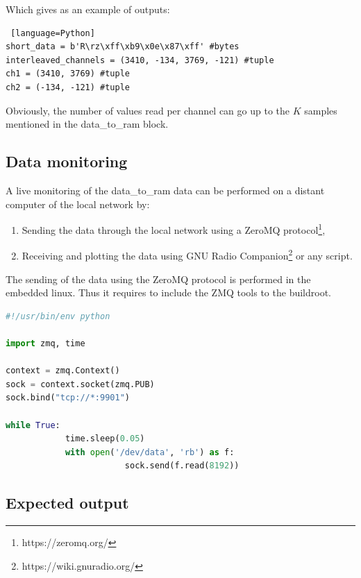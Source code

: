 \documentclass[12pt,oneside]{article}
\begin{document}
Which gives as an example of outputs:


\begin{lstlisting} [language=Python]
short_data = b'R\rz\xff\xb9\x0e\x87\xff' #bytes
interleaved_channels = (3410, -134, 3769, -121) #tuple
ch1 = (3410, 3769) #tuple
ch2 = (-134, -121) #tuple
\end{lstlisting}
\vspace{0.6cm}

Obviously, the number of values read per channel can go up to the $K$ samples mentioned in the data\_to\_ram block. 

\subsection{Data monitoring}

A live monitoring of the data\_to\_ram data can be performed on a distant computer of the local network by:
\begin{enumerate}
	\item Sending the data through the local network using a ZeroMQ protocol\footnote{https://zeromq.org/},
	\item Receiving and plotting the data using GNU Radio Companion\footnote{https://wiki.gnuradio.org/} or any script.
\end{enumerate}

The sending of the data using the ZeroMQ protocol is performed in the embedded linux. Thus it requires to include the ZMQ tools to the buildroot. 

\begin{lstlisting}[language=Python]
#!/usr/bin/env python

import zmq, time

context = zmq.Context()
sock = context.socket(zmq.PUB)
sock.bind("tcp://*:9901")

while True:
			time.sleep(0.05)
			with open('/dev/data', 'rb') as f:
						sock.send(f.read(8192))
\end{lstlisting}
\vspace{0.6cm}

\subsection{Expected output}\label{sect:expOMon}
\end{document}
